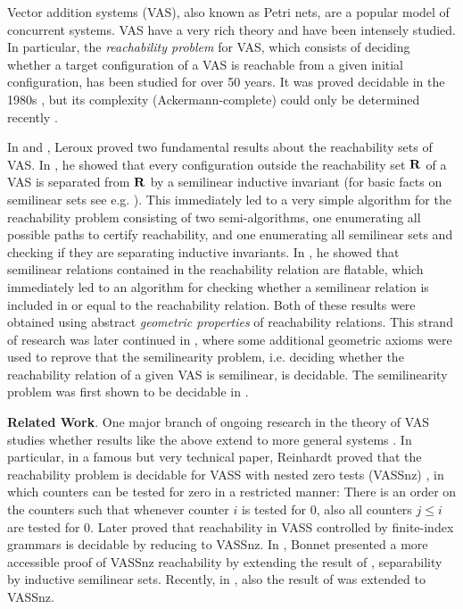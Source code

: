 
Vector addition systems (VAS), also known as Petri nets, are a popular model of concurrent systems. VAS have a very rich theory and have been intensely studied. In particular, the \emph{reachability problem} for VAS, which consists of deciding whether a target configuration of a VAS is reachable from a given initial configuration, has been studied for over 50 years. It was proved decidable in the 1980s \cite{Mayr81,Kosaraju82, Lambert92}, but its complexity (Ackermann-complete) could only be determined recently \cite{LerouxS19, CzerwinskiLLLM19, CzerwinskiO21, Leroux21}. 

In \cite{Leroux09} and \cite{Leroux13}, Leroux proved two fundamental results about the reachability sets of VAS. 
In \cite{Leroux09}, he showed that every configuration outside the reachability set $\mathbf{R}$ of a VAS is separated from $\mathbf{R}$ by a semilinear inductive invariant (for basic facts on semilinear sets see e.g. \cite{Haase18}). This immediately led to a very simple algorithm for the reachability problem consisting of two semi-algorithms, one enumerating all possible paths to certify reachability, and one enumerating all semilinear sets and checking if they are separating inductive invariants.
In \cite{Leroux13}, he showed that semilinear relations contained in the reachability relation are flatable, which immediately led to an algorithm for checking whether a semilinear relation is included in or equal to the reachability relation. Both of these results were obtained using abstract \emph{geometric properties} of reachability relations. This strand of research was later continued in \cite{GuttenbergRE23}, where some additional geometric axioms were used to reprove that the semilinearity problem, i.e. deciding whether the reachability relation of a given VAS is semilinear, is decidable. The semilinearity problem was first shown to be decidable in \cite{Hauschildt90}.

\textbf{Related Work}. One major branch of ongoing research in the theory of VAS studies whether results like the above extend to more general systems \cite{Reinhardt08, Bonnet11, Bonnet12, RosaVelardoF11, AtigG11, LerouxPS14, LerouxST15, HofmanLLLST16, LazicS16, FinkelLS18, LerouxS20, BlondinL23}. In particular, in a famous but very technical paper, Reinhardt proved that the reachability problem is decidable for VASS with nested zero tests (VASSnz) \cite{Reinhardt08}, in which counters can be tested for zero in a restricted manner: There is an order on the counters such that whenever counter \(i\) is tested for \(0\), also all counters \(j \leq i\) are tested for \(0\). Later \cite{AtigG11} proved that reachability in VASS controlled by finite-index grammars is decidable by reducing to VASSnz. In \cite{Bonnet11, Bonnet12}, Bonnet presented a more accessible proof of VASSnz reachability by extending the result of \cite{Leroux09}, separability by inductive semilinear sets. Recently, in \cite{Guttenberg24}, also the result of \cite{Leroux13} was extended to VASSnz.

